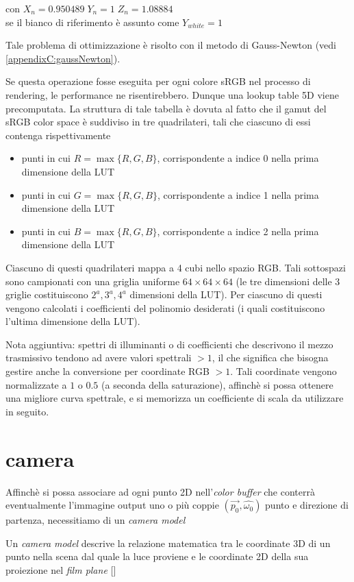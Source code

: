 \begin{center}
con $X_n = 0.950489\;Y_n = 1\; Z_n = 1.08884$\\
se il bianco di riferimento \`e assunto come $Y_{white} = 1$\par
\end{center}
Tale problema di ottimizzazione \`e risolto con il metodo di Gauss-Newton (vedi \ref{appendixC:gaussNewton}).\par
Se questa operazione fosse eseguita per ogni colore sRGB nel processo di rendering, le performance ne risentirebbero. Dunque una lookup table 5D viene
precomputata. La struttura di tale tabella \`e dovuta al fatto che il gamut del sRGB color space \`e suddiviso in tre quadrilateri, tali che 
ciascuno di essi contenga rispettivamente 
\begin{itemize}[topsep=0pt, noitemsep]
	\item punti in cui $R = \max\{R, G, B\}$, corrispondente a indice 0 nella prima dimensione della LUT
	\item punti in cui $G = \max\{R, G, B\}$, corrispondente a indice 1 nella prima dimensione della LUT
	\item punti in cui $B = \max\{R, G, B\}$, corrispondente a indice 2 nella prima dimensione della LUT
\end{itemize}
Ciascuno di questi quadrilateri mappa a 4 cubi nello spazio RGB. Tali sottospazi sono campionati con una griglia uniforme 
$64\times 64\times64$ (le tre dimensioni 
delle 3 griglie costituiscono $2^a, 3^a, 4^a$ dimensioni della LUT). Per ciascuno di questi vengono calcolati i coefficienti del polinomio 
desiderati (i quali costituiscono l'ultima dimensione della LUT).\par
Nota aggiuntiva: spettri di illuminanti o di coefficienti che descrivono il mezzo trasmissivo tendono ad avere valori spettrali $>1$, il che significa
che bisogna gestire anche la conversione per coordinate RGB $>1$. Tali coordinate vengono normalizzate a $1$ o $0.5$ (a seconda della saturazione), 
affinch\`e si possa ottenere una migliore curva spettrale, e si memorizza un coefficiente di scala da utilizzare in seguito.
\section{camera}\label{chapter2:camera}
Affinch\`e si possa associare ad ogni punto 2D nell'\textit{color buffer} che conterr\`a eventualmente l'immagine output uno o pi\`u coppie 
$(\vec{p_0}, \hat{\omega_0})$ punto e direzione di partenza, necessitiamo di un \textit{camera model}
\begin{definitionS}
	Un \textit{camera model} descrive la relazione matematica tra le coordinate 3D di un punto nella scena dal quale la luce proviene e le coordinate 
	2D della sua proiezione nel \textit{film plane}\footnotemark{} [\cite{vision}]
\end{definitionS}
